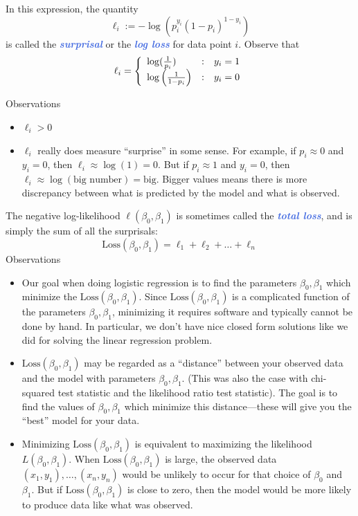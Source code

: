 \documentclass[10pt]{article}
\theoremstyle{definition}
\newcommand{\1}[1]{\textbf{1}_{\left[#1\right]}} %
\newcommand{\demph}[1]{\textcolor{RoyalBlue}{\textbf{\slshape #1}}} %
\begin{document}
In this expression, the quantity
\begin{equation*}
  \ell_{i} := - \log\left(p_{i}^{y_{i}}(1-p_{i})^{1-y_{i}} \right)
\end{equation*}
is called the \demph{surprisal} or the \demph{log loss} for data point $i$.
Observe that
\begin{equation*}
  \ell_{i}
  = \left\{ 
    \begin{array}{l@{\quad:\quad}l} \log(\frac{1}{p_{i}}) & y_{i}=1\\ \log\left(\frac{1}{1-p_{i}} \right)  & y_{i}=0 \end{array}\right. 
\end{equation*}

Observations
\begin{itemize}
  \item $\ell_{i}>0$
  \item $\ell_{i}$ really does measure ``surprise'' in some sense. For
  example, if $p_{i}\approx 0$  and $y_{i}=0$, then $\ell_{i} \approx
  \log(1)=0$. But if $p_{i} \approx 1$ and $y_{i}=0$, then $\ell_{i}\approx
  \log(\text{big number})=\text{big}$. Bigger values means there is more
  discrepancy between what is predicted by the model and what is observed.
\end{itemize}
The negative log-likelihood $\ell(\beta_{0},\beta_{1})$ is sometimes called
the \demph{total loss}, and is simply the sum of all the surprisals:
\begin{equation*}
  \mathrm{Loss}(\beta_{0},\beta_{1}) = \ell_{1}+\ell_{2}+\ldots+\ell_{n}
\end{equation*}
Observations
\begin{itemize}
  \item Our goal when doing logistic regression is to find the parameters
  $\beta_{0},\beta_{1}$ which minimize the
  $\mathrm{Loss}(\beta_{0},\beta_{1})$. Since
  $\mathrm{Loss}(\beta_{0},\beta_{1})$ is a complicated function of the
  parameters $\beta_{0},\beta_{1}$, minimizing it requires software and
  typically cannot be done by hand. In particular, we don't have nice closed
  form solutions like we did for solving the linear regression problem.
  
  \item$\mathrm{Loss}(\beta_0,\beta_1)$ may be regarded as a ``distance''
  between your observed data and the model with parameters $\beta_0,\beta_1$.
  (This was also the case with chi-squared test statistic and the likelihood
  ratio test statistic). The goal is to find the values of $\beta_0,\beta_1$
  which minimize this distance---these will give you the ``best'' model for
  your data.

  \item Minimizing $\textrm{Loss}(\beta_{0},\beta_{1})$ is equivalent to
  maximizing the likelihood $L(\beta_{0},\beta_{1})$. When
  $\mathrm{Loss}(\beta_0,\beta_1)$ is large, the observed data
  $(x_{1},y_{1}),\ldots,(x_{n},y_{n})$ would be unlikely to occur for that
  choice of $\beta_{0}$ and $\beta_{1}$. But if
  $\mathrm{Loss}(\beta_0,\beta_1)$ is close to zero, then the model would be
  more likely to produce data like what was observed.
  
\end{itemize}
\end{document}
